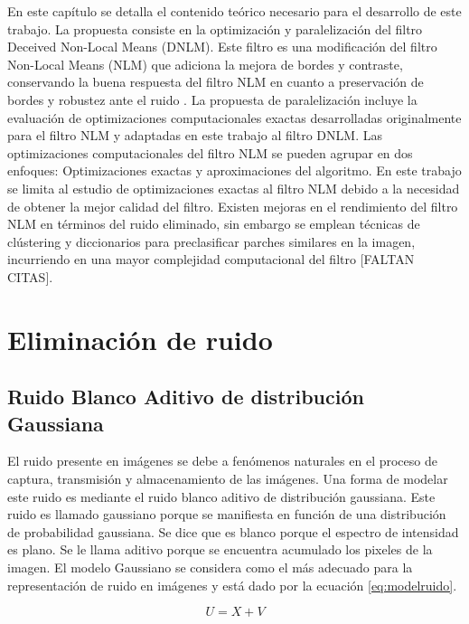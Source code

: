 En este cap\'itulo se detalla el contenido te\'orico necesario para el desarrollo de este trabajo. La propuesta consiste en la optimizaci\'on y paralelizaci\'on del filtro Deceived Non-Local Means (DNLM). Este filtro es una modificaci\'on del filtro Non-Local Means (NLM) que adiciona la mejora de bordes y contraste, conservando la buena respuesta del filtro NLM en cuanto a preservaci\'on de bordes y robustez ante el ruido \cite{calderon2015dewaff}. La propuesta de paralelizaci\'on incluye la evaluaci\'on de optimizaciones computacionales exactas desarrolladas originalmente para el filtro NLM y adaptadas en este trabajo al filtro DNLM. Las optimizaciones computacionales del filtro NLM se pueden agrupar en dos enfoques: Optimizaciones exactas y aproximaciones del algoritmo.  En este trabajo se limita al estudio de optimizaciones exactas al filtro NLM debido a la necesidad de obtener la mejor calidad del filtro. Existen mejoras en el rendimiento del filtro NLM en t\'erminos del ruido eliminado, sin embargo se emplean t\'ecnicas de cl\'ustering y diccionarios para preclasificar parches similares en la imagen, incurriendo en una mayor complejidad computacional del filtro [FALTAN CITAS]. 



\section{Eliminaci\'on de ruido}

\subsection{Ruido Blanco Aditivo de distribuci\'on Gaussiana}
\label{ch:marco_agwn}

El ruido presente en im\'agenes se debe a fen\'omenos naturales en el proceso de captura, transmisi\'on y almacenamiento de las im\'agenes. 	Una forma de modelar este ruido es mediante el ruido blanco aditivo de distribuci\'on gaussiana. Este ruido es llamado gaussiano porque se manifiesta en funci\'on de una distribuci\'on de probabilidad gaussiana. Se dice que es blanco porque el espectro de intensidad es plano. Se le llama aditivo porque se encuentra acumulado los pixeles de la imagen. El modelo Gaussiano se considera como el m\'as adecuado para la representaci\'on de ruido en im\'agenes y est\'a dado por la ecuaci\'on \ref{eq:modelruido}.

\begin{equation}
\label{eq:modelruido}
U = X + V
\end{equation}


